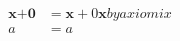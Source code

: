     \begin{align*}
        \textbf{x} + \textbf{0} &= \textbf{x} + 0\textbf{x}  by axiom ix\\
        a &= a
    \end{align*}